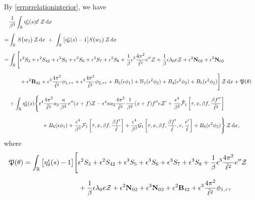 \documentclass[10pt, reqno]{amsart}
\numberwithin{equation}{section}
\theoremstyle{definition}
\begin{document}
{By \eqref{errorrelationinterior}, we have
\begin{align*}
& \frac{1}{\beta^3}\int_{\mathbb R}\eta_\delta^\epsilon(s){\mathcal E}\,{\mathcal Z} \,{\mathrm d}x
\nonumber\\[2mm]
=& \int_{{\mathbb R}}\, S\big(w_2\big)\,{\mathcal Z} \,{\mathrm d}x
\ +\
\int_{\mathbb R} \big[\eta_\delta^\epsilon(s)-1\big]S\big(w_2\big)\,{\mathcal Z} \,{\mathrm d}x
\nonumber\\[2mm]
=&
\int_{\mathbb R} \Bigg[\epsilon^2 S_{3} + \epsilon^2 S_{42} + \epsilon^3 S_{5} +\epsilon^3 S_{6}
 +\epsilon^3 S_{7} +\epsilon^3 S_{8}
 +\frac 1\beta\epsilon^3\frac{4\pi^2}{{\tilde\ell}^2} e''\mathcal Z
 +\frac 1\beta \epsilon\lambda_0 e{\mathcal Z}
 +\epsilon^2 {\bf N}_{02}
  +\epsilon^3 {\bf N}_{03}
\nonumber\\[2mm]
&\qquad+ \epsilon^2 {\bf B}_{42}
 + \epsilon^3 \frac{4\pi^2}{{\tilde\ell}^2} {\phi}_{1, \tau\tau}
+ \epsilon^4 \frac{4\pi^2}{{\tilde\ell}^2}\phi_{2, \tau\tau}
+B_{5}(\epsilon\phi_1) + \mathbb{N}_1 (\epsilon^2 \phi_2)
+ B_4(\epsilon^2\phi_2)+ B_5 (\epsilon^2{\phi_2}) \Bigg] \,{\mathcal Z} \,{\mathrm d}x + \mathfrak P(\theta)
\nonumber\\[2mm]
&
 +\int_{\mathbb R} \eta_\delta^\epsilon(s) \Bigg\{\epsilon^4 \frac{4\pi^2} {{\tilde\ell}^2} a_2\frac{\kappa}{\, \beta^2\, } e'' (x+f)\mathcal Z -\epsilon^4 \kappa a_2 \frac{ 4\pi^2} {{\tilde\ell}^2} \frac{1}{\, \beta^2\, } (x+f) f'' e \mathcal Z' + \frac{\epsilon^4}{\beta^2} \hat{\mathcal F}_1\left[\tau, x, \beta f, \frac{\beta f''}{\tilde\ell^2} \right]
\nonumber\\[2mm]
&\qquad\qquad\qquad
+B_{6}(\epsilon\phi_1)
 + \frac{\epsilon^4}{\beta^2} \mathcal F_1\left[\tau, x, \beta f, \frac{\beta f'}{\tilde\ell}\right]
 +\frac{\epsilon^4} {\beta^2} \mathcal G_1\left[\tau, x, \beta f, \frac{\beta f'}{\tilde\ell}, e, \frac{e'}{\tilde\ell}\right]
 + B_6 (\epsilon^2{\phi_2}) \Bigg\} \,{\mathcal Z} \,{\mathrm d}x,
\end{align*}
 where
\begin{align*}
 \mathfrak P(\theta) & = \int_{\mathbb R}\big[\eta_\delta^\epsilon(s)-1\big] \Bigg[\epsilon^2 S_{3} + \epsilon^2 S_{42} + \epsilon^3 S_{5} +\epsilon^3 S_{6}
 +\epsilon^3 S_{7} +\epsilon^3 S_{8}
 +\frac 1\beta\epsilon^3\frac{4\pi^2}{{\tilde\ell}^2} e''\mathcal Z
\nonumber\\[2mm]
&\qquad \qquad \qquad \qquad
 +\frac 1\beta \epsilon\lambda_0 e{\mathcal Z}
 +\epsilon^2 {\bf N}_{02}
  +\epsilon^3 {\bf N}_{03}+ \epsilon^2 {\bf B}_{42}
 + \epsilon^3 \frac{4\pi^2}{{\tilde\ell}^2} {\phi}_{1, \tau\tau}

\end{align*}}
\end{document}
